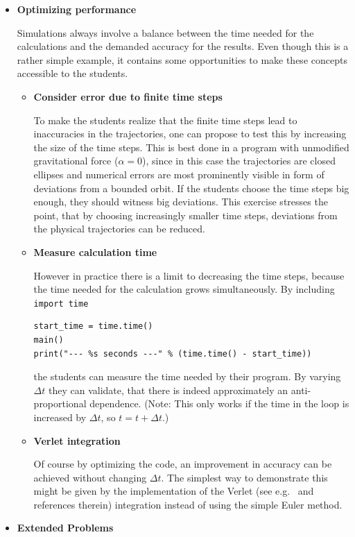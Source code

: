 \documentclass[12pt,ngerman,american]{iopart}
\begin{document}
\begin{itemize}
\item \textbf{Optimizing performance}

Simulations always involve a balance between the time needed for the calculations and the demanded accuracy for the results.
Even though this is a rather simple example, it contains some opportunities to make these concepts accessible to the students.

\begin{itemize}
\item \textbf{Consider error due to finite time steps}

To make the students realize that the finite time steps lead to inaccuracies in the trajectories, one can propose to test this by increasing the size of the time steps.
This is best done in a program with unmodified gravitational force ($\alpha=0$), since in this case the trajectories are closed ellipses and numerical errors are most prominently visible in form of deviations from a bounded orbit.
If the students choose the time steps big enough, they should witness big deviations.
This exercise stresses the point, that by choosing increasingly smaller time steps, deviations from the physical trajectories can be reduced.
\item \textbf{Measure calculation time}

However in practice there is a limit to decreasing the time steps, because the time needed for the calculation grows simultaneously.
By including \texttt{import time}
\begin{lstlisting}
start_time = time.time()
main()
print("--- %s seconds ---" % (time.time() - start_time))
\end{lstlisting}
the students can measure the time needed by their program.
By varying $\Delta t$ they can validate, that there is indeed approximately an anti-proportional dependence.
(Note: This only works if the time in the loop is increased by $\Delta t$, so $t=t+\Delta t$.)
\item \textbf{Verlet integration}

Of course by optimizing the code, an improvement in accuracy can be achieved without changing $\Delta t$.
The simplest way to demonstrate this might be given by the implementation of the Verlet (see e.g.~\cite{Hairer03geometricnumerical} and references therein) integration instead of using the simple Euler method.
\end{itemize}

\item \textbf{Extended Problems}


\end{itemize}
\end{document}
